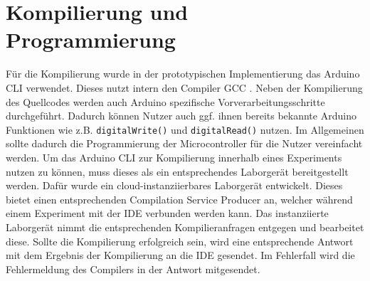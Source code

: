 \section{Kompilierung und Programmierung}\label{section:prototypische-implementierung:kompilierung-und-programmierung}


Für die Kompilierung wurde in der prototypischen Implementierung das \ac{Arduino CLI} \cite{noauthor_arduino-cli_nodate} verwendet. Dieses nutzt intern den Compiler \ac{GCC} \cite{noauthor_gcc_nodate}. Neben der Kompilierung des Quellcodes werden auch Arduino spezifische Vorverarbeitungsschritte durchgeführt. Dadurch können Nutzer auch ggf. ihnen bereits bekannte Arduino Funktionen wie z.B. \texttt{digitalWrite()} und \texttt{digitalRead()} nutzen. Im Allgemeinen sollte dadurch die Programmierung der Microcontroller für die Nutzer vereinfacht werden. Um das \ac{Arduino CLI} zur Kompilierung innerhalb eines Experiments nutzen zu können, muss dieses als ein entsprechendes Laborgerät bereitgestellt werden. Dafür wurde ein cloud-instanziierbares Laborgerät entwickelt. Dieses bietet einen entsprechenden Compilation Service Producer an, welcher während einem Experiment mit der IDE verbunden werden kann. Das instanziierte Laborgerät nimmt die entsprechenden Kompilieranfragen entgegen und bearbeitet diese. Sollte die Kompilierung erfolgreich sein, wird eine entsprechende Antwort mit dem Ergebnis der Kompilierung an die IDE gesendet. Im Fehlerfall wird die Fehlermeldung des Compilers in der Antwort mitgesendet.

